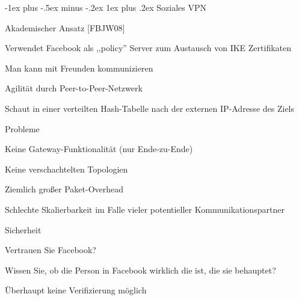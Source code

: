 \documentclass[a4paper]{article}
\makeatletter
\renewcommand{\subsubsection}{\@startsection{subsubsection}{3}{0mm}%
 {-1ex plus -.5ex minus -.2ex}%
 {1ex plus .2ex}%
 {\normalfont\small\bfseries}}
\makeatother
\begin{document}
\begin{multicols}{3}
\begin{itemize*}
            \subsubsection{Soziales VPN}
            \begin{itemize*}
                  \item       Akademischer Ansatz {[}FBJW08{]}
                  \item       Verwendet Facebook als ,,policy'' Server zum Austausch von IKE
                  Zertifikaten
                  \begin{itemize*}
                        \item Man kann mit Freunden kommunizieren
                  \end{itemize*}
                  \item       Agilität durch Peer-to-Peer-Netzwerk
                  \begin{itemize*}
                        \item Schaut in einer verteilten Hash-Tabelle nach der externen IP-Adresse des Ziels
                  \end{itemize*}
                  \item       Probleme
                  \begin{itemize*}
                        \item Keine Gateway-Funktionalität (nur Ende-zu-Ende)
                        \item Keine verschachtelten Topologien
                        \item Ziemlich großer Paket-Overhead
                        \item Schlechte Skalierbarkeit im Falle vieler potentieller Kommunikationspartner
                        \item Sicherheit
                        \begin{itemize*} \item Vertrauen Sie Facebook? \item Wissen Sie, ob die Person in Facebook wirklich die ist, die sie behauptet? \item Überhaupt keine Verifizierung möglich \end{itemize*}
                  \end{itemize*}
            \end{itemize*}


\end{itemize*}
\end{multicols}
\end{document}
